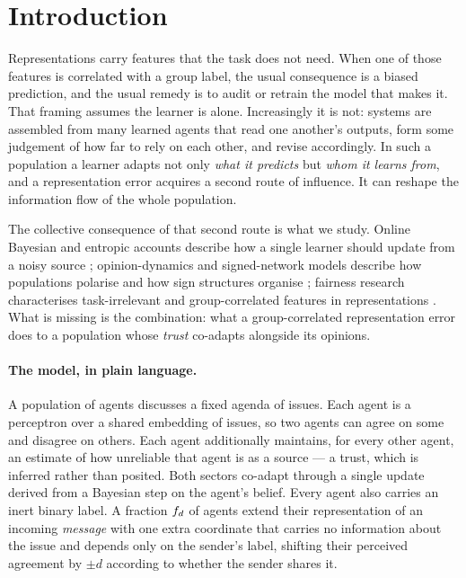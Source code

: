 \section{Introduction}
\label{sec:intro}

Representations carry features that the task does not need. When one of those
features is correlated with a group label, the usual consequence is a biased
prediction, and the usual remedy is to audit or retrain the model that makes it.
That framing assumes the learner is alone. Increasingly it is not: systems are
assembled from many learned agents that read one another's outputs, form some
judgement of how far to rely on each other, and revise accordingly. In such a
population a learner adapts not only \emph{what it predicts} but \emph{whom it
learns from}, and a representation error acquires a second route of influence.
It can reshape the information flow of the whole population.

The collective consequence of that second route is what we study. Online
Bayesian and entropic accounts describe how a single learner should update from
a noisy source
\citep{opper1996online,opper1998bayesian,solla1999optimal,caticha2020entropic};
opinion-dynamics and signed-network models describe how populations polarise and
how sign structures organise
\citep{deffuant2000mixing,castellano2009statistical,heider1946attitudes,cartwright1956structural};
fairness research characterises task-irrelevant and group-correlated features in
representations
\citep{dwork2012fairness,hardt2016equality,barocas2023fairness}. What is missing
is the combination: what a group-correlated representation error does to a
population whose \emph{trust} co-adapts alongside its opinions.

\paragraph{The model, in plain language.}
A population of agents discusses a fixed agenda of issues. Each agent is a
perceptron over a shared embedding of issues, so two agents can agree on some
and disagree on others. Each agent additionally maintains, for every other
agent, an estimate of how unreliable that agent is as a source --- a trust, which
is inferred rather than posited. Both sectors co-adapt through a single update
derived from a Bayesian step on the agent's belief. Every agent also carries an
inert binary label. A fraction $f_{d}$ of agents extend their representation of an
incoming \emph{message} with one extra coordinate that carries no information
about the issue and depends only on the sender's label, shifting their perceived
agreement by $\pm d$ according to whether the sender shares it.

